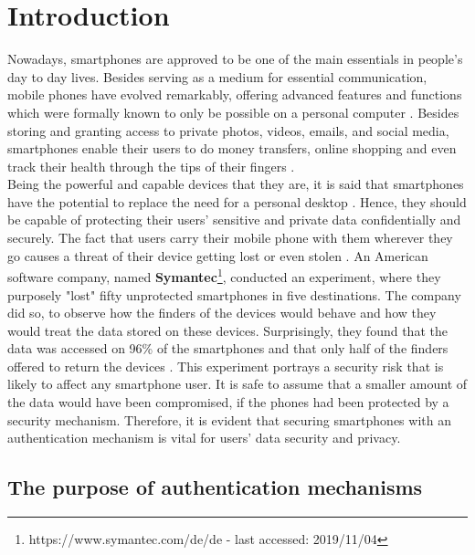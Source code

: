 \chapter{Introduction}\label{ch:first}

Nowadays, smartphones are approved to be one of the main essentials in people's day to day lives. Besides serving as a medium for essential communication, mobile phones have evolved remarkably, offering advanced features and functions which were formally known to only be possible on a personal computer \cite{Alsaleh}. Besides storing and granting access to private photos, videos, emails, and social media, smartphones enable their users to do money transfers, online shopping and even track their health through the tips of their fingers \cite{Egelman:2014:YRL:2660267.2660273,Albayram:2017:BUL:3235924.3235929,Schloeglhofer}. \\

Being the powerful and capable devices that they are, it is said that smartphones have the potential to replace the need for a personal desktop \cite{Alsaleh}. Hence, they should be capable of protecting their users' sensitive and private data confidentially and securely. The fact that users carry their mobile phone with them wherever they go causes a threat of their device getting lost or even stolen \cite{Egelman:2014:YRL:2660267.2660273}. An American software company, named \textbf{Symantec}\footnote{https://www.symantec.com/de/de - last accessed: 2019/11/04}, conducted an experiment, where they purposely "lost" fifty unprotected smartphones in five destinations. The company did so, to observe how the finders of the devices would behave and how they would treat the data stored on these devices. Surprisingly, they found that the data was accessed on 96\% of the smartphones and that only half of the finders offered to return the devices \cite{symantec}.  This experiment portrays a security risk that is likely to affect any smartphone user.  It is safe to assume that a smaller amount of the data would have been compromised, if the phones had been protected by a security mechanism. Therefore, it is evident that securing smartphones with an authentication mechanism is vital for users' data security and privacy.

\section{The purpose of authentication mechanisms}

